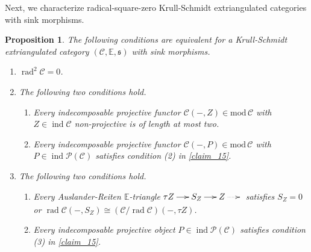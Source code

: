 \documentclass[12pt]{amsart}
\makeatletter
\numberwithin{equation}{subsection}
\theoremstyle{plain}
\newtheorem{proposition}[theorem]{Proposition}
\theoremstyle{definition}
\newcommand{\rad}{\operatorname{rad}}
\renewcommand{\mod}{\mathrm{mod}\,}
\newcommand{\Proj}{\mathcal{P}}
\newcommand{\ind}{\operatorname{ind}}
\newcommand{\C}{\mathcal{C}}
\newcommand{\E}{\mathbb{E}}
\newcommand{\s}{\mathfrak{s}}
\newcommand{\tri}[6]{\!\!\xymatrix@C=5mm{#1\ar[r]^-{#2}&#3\ar[r]^-{#4}&#5\ar@{..>}[r]^-{#6}&}\!\!}
\makeatother
\begin{document}
Next, we characterize radical-square-zero Krull-Schmidt extriangulated categories with sink morphisms.




\begin{proposition}\label{claim_39}
The following conditions are equivalent for a Krull-Schmidt extriangulated
category $(\C, \E, \s)$ with sink morphisms.
\begin{enumerate}
\item $\rad^2\C = 0$.
\item The following two conditions hold.
\begin{enumerate}
    \item Every indecomposable projective functor $\C(-, Z)\in\mod\C$ with $Z\in\ind\C$ non-projective is of length at most two.
    \item Every indecomposable projective functor $\C(-, P)\in\mod\C$ with $P\in\ind\Proj(\C)$ satisfies condition (2) in \cref{claim_15}.
\end{enumerate}
\item The following two conditions hold.
\begin{enumerate}
    \item Every Auslander-Reiten $\E$-triangle $\tri{\tau Z}{}{S_Z}{}{Z}{}$ satisfies $S_Z=0$ or $\rad\C(-, S_Z)\cong (\C/\rad\C)(-,\tau Z)$.
    \item Every indecomposable projective object $P\in\ind\Proj(\C)$ satisfies condition (3) in \cref{claim_15}.
\end{enumerate}
\end{enumerate}
\end{proposition}
\end{document}
